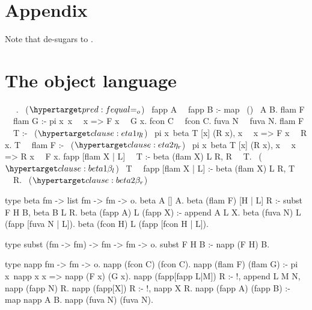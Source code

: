 \section*{Appendix}

Note that  de-sugars to .

\section{The object language}


\begin{elpicode}
~  ~.                           ~($\customlabel{pred:fequal}{\Eo}$)~
fapp A ~\Eo~fapp B :- map ~(\Eo)~ A B.
flam F ~\Eo~flam G :- pi x\ x ~\Eo~x => F x ~\Eo~G x.
fcon C ~\Eo~fcon C.
fuva N ~\Eo~fuva N.
flam F ~\Eo~T :-                                       ~($\customlabel{clause:eta1}{\eta_l}$)~
  pi x\ beta T [x] (R x), x ~\Eo~x => F x ~\Eo~R x.
T ~\Eo~flam F :-                                       ~($\customlabel{clause:eta2}{\eta_r}$)~
  pi x\ beta T [x] (R x), x ~\Eo~x => R x ~\Eo~F x.
fapp [flam X | L] ~\Eo~T :- beta (flam X) L R, R ~\Eo~T. ~($\customlabel{clause:beta1}{\beta_l}$)~
T ~\Eo~fapp [flam X | L] :- beta (flam X) L R, T ~\Eo~R. ~($\customlabel{clause:beta2}{\beta_r}$)~

type beta fm -> list fm -> fm -> o.
beta A [] A.
beta (flam F) [H | L] R :- subst F H B,
  beta B L R. %
beta (fapp A) L (fapp X) :- append A L X.
beta (fuva N) L (fapp [fuva N | L]).
beta (fcon H) L (fapp [fcon H | L]).

type subst (fm -> fm) -> fm -> fm -> o.
subst F H B :- napp (F H) B. %

type napp fm -> fm -> o.
napp (fcon C) (fcon C).
napp (flam F) (flam G) :- pi x\ napp x x => napp (F x) (G x).
napp (fapp[fapp L|M]) R :- !, append L M N, napp (fapp N) R.
napp (fapp[X]) R :- !, napp X R.
napp (fapp A) (fapp B) :- map napp A B.
napp (fuva N) (fuva N).
\end{elpicode}

